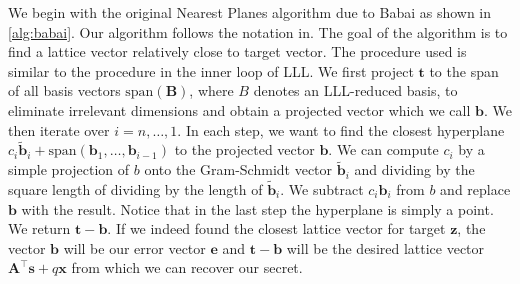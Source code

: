 





We begin with the original Nearest Planes algorithm due to Babai \cite{Bab85} as shown in \cref{alg:babai}. Our algorithm follows the notation in\cite{NPReg04}. The goal of the algorithm is to find a lattice vector relatively close to target vector. The procedure used is similar to the procedure in the inner loop of LLL. We first project $\mathbf{t}$ to the span of all basis vectors $\text{span}(\mathbf{B})$, where $B$ denotes an LLL-reduced basis, to eliminate irrelevant dimensions and obtain a projected vector which we call $\mathbf{b}$. We then iterate over $i=n, \ldots, 1$. In each step, we want to find the closest hyperplane $c_i \tilde{\mathbf{b}}_i + \text{span}(\mathbf{b}_1, \dots, \mathbf{b}_{i-1})$ to the projected vector $\mathbf{b}$. We can compute $c_i$ by a simple projection of $b$ onto the Gram-Schmidt vector $\tilde{\mathbf{b}}_i$ and dividing by the square length of dividing by the length of $\tilde{\mathbf{b}}_i$. We subtract $c_i \mathbf{b}_i$ from $b$ and replace $\mathbf{b}$ with the result. Notice that in the last step the hyperplane is simply a point. We return $\mathbf{t} - \mathbf{b}$. If we indeed found the closest lattice vector for target $\mathbf{z}$, the vector $\mathbf{b}$ will be our error vector $\mathbf{e}$ and $\mathbf{t} - \mathbf{b}$ will be the desired lattice vector  $\mathbf{A}^\intercal \mathbf{s} + q \mathbf{x}$ from which we can recover our secret.


